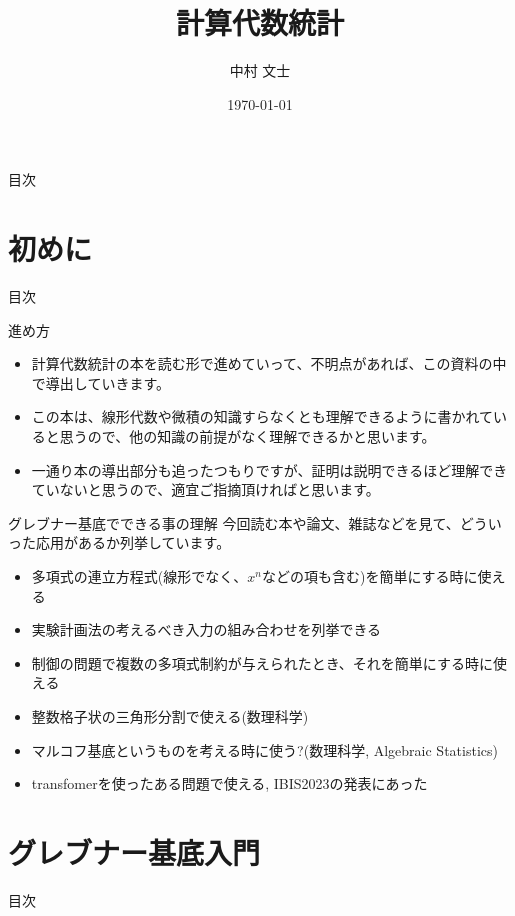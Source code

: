\documentclass[aspectratio=169, dvipdfmx, 11pt]{beamer} %
\title[Short title]{計算代数統計}
\author[著者略称]{中村 文士}
\date{\today}
\begin{document}
\maketitle

\begin{frame}{目次}
	\tableofcontents
\end{frame}

\section{初めに}
\begin{frame}{目次}
	\tableofcontents[currentsection]
\end{frame}

\begin{frame}{進め方}
	\begin{itemize}
		\item 計算代数統計の本を読む形で進めていって、不明点があれば、この資料の中で導出していきます。
		\item この本は、線形代数や微積の知識すらなくとも理解できるように書かれていると思うので、他の知識の前提がなく理解できるかと思います。
		\item 一通り本の導出部分も追ったつもりですが、証明は説明できるほど理解できていないと思うので、適宜ご指摘頂ければと思います。
	\end{itemize}
\end{frame}

\begin{frame}{グレブナー基底でできる事の理解}
	今回読む本や論文、雑誌などを見て、どういった応用があるか列挙しています。
	\begin{itemize}
		\item 多項式の連立方程式(線形でなく、$x^n$などの項も含む)を簡単にする時に使える
		\item 実験計画法の考えるべき入力の組み合わせを列挙できる
		\item 制御の問題で複数の多項式制約が与えられたとき、それを簡単にする時に使える
		\item 整数格子状の三角形分割で使える(数理科学)
		\item マルコフ基底というものを考える時に使う?(数理科学, Algebraic Statistics)
		\item transfomerを使ったある問題で使える, IBIS2023の発表にあった
	\end{itemize}
\end{frame}

\section{グレブナー基底入門}
\begin{frame}{目次}
	\tableofcontents[currentsection]
\end{frame}
\end{document}
